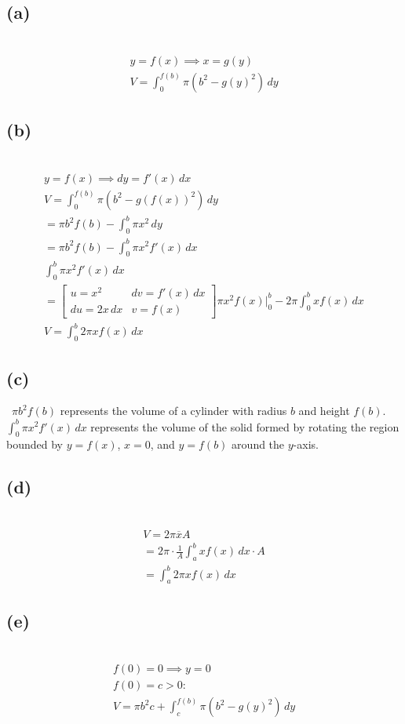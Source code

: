 \documentclass[12pt]{article}
\newcommand{\at}{\Big|}
\newcommand{\vem}{\vspace{0.5em}}
\newcommand{\subproblem}[1]{\subsection{(#1)} \,}
\begin{document}
\subproblem{a}
\begin{gather*}
    y=f(x)\implies x=g(y)\\
    \boxed{V=\int_0^{f(b)}\pi (b^2-g(y)^2)\, dy}
\end{gather*}

\subproblem{b}
\begin{gather*}
    y=f(x)\implies dy=f'(x) \, dx\\
    V=\int_0^{f(b)}\pi (b^2-g(f(x))^2)\, dy\\
    = \pi b^2 f(b)- \int_0^{b} \pi x^2\, dy\\
    =\pi b^2 f(b)- \int_0^{b} \pi x^2f'(x)\, dx\\
    \int_0^{b} \pi x^2f'(x)\, dx\\
    =\begin{bmatrix}
        u=x^2 & dv=f'(x)\, dx\\
        du=2x\, dx  & v=f(x)
    \end{bmatrix} \pi x^2f(x)\at_0^b - 2\pi \int_0^b x f(x) \, dx\\
    \boxed{V= \int_0^b 2\pi xf(x)\, dx}
\end{gather*}

\subproblem{c}
$\pi b^2f(b)$ represents the volume of a cylinder with radius $b$ and height $f(b)$. $\int_0^b \pi x^2 f'(x)\, dx$ represents the volume of the solid formed by rotating the region bounded by $y=f(x)$, $x=0$, and $y=f(b)$ around the $y$-axis.\vem

\subproblem{d}
\begin{gather*}
    V=2\pi \overline{x} A\\
    =2\pi \cdot \frac{1}{A}\int_a^bx f(x)\, dx\cdot A\\
    =\boxed{ \int_a^b2\pi xf(x)\, dx}
\end{gather*}

\subproblem{e}
\begin{gather*}
    f(0)=0 \implies y=0\\
    f(0)=c>0:\\
    V=\pi b^2 c+\int_c^{f(b)}\pi (b^2-g(y)^2)\, dy
\end{gather*}
\end{document}
